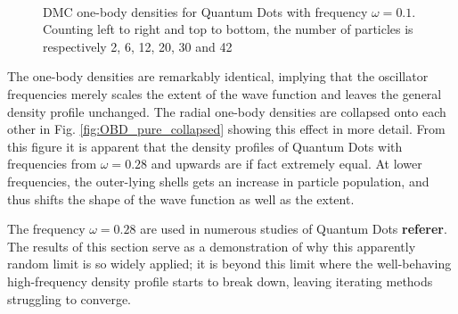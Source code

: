 \begin{figure}
\begin{center}
   \\
  \caption{DMC one-body densities for Quantum Dots with frequency $\omega=0.1$. Counting left to right and top to bottom, the number of particles is respectively 2, 6, 12, 20, 30 and 42}
  \label{fig:OBD_DMC_QDOTS_w01}
 \end{center}
\end{figure}

\clearpage

The one-body densities are remarkably identical, implying that the oscillator frequencies merely scales the extent of the wave function and leaves the general density profile unchanged. The radial one-body densities are collapsed onto each other in Fig. \ref{fig:OBD_pure_collapsed} showing this effect in more detail. From this figure it is apparent that the density profiles of Quantum Dots with frequencies from $\omega=0.28$ and upwards are if fact extremely equal. At lower frequencies, the outer-lying shells gets an increase in particle population, and thus shifts the shape of the wave function as well as the extent.

The frequency $\omega=0.28$ are used in numerous studies of Quantum Dots \textbf{referer}. The results of this section serve as a demonstration of why this apparently random limit is so widely applied; it is beyond this limit where the well-behaving high-frequency density profile starts to break down, leaving iterating methods struggling to converge.   

